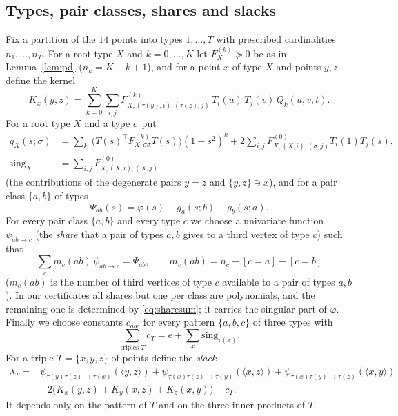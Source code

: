 \documentclass[11pt]{article}
\theoremstyle{definition}
\newcommand{\ip}[2]{\langle #1,#2\rangle}
\newcommand{\PSD}{\succeq 0}
\begin{document}
\subsection{Types, pair classes, shares and slacks}
Fix a partition of the $14$ points into types $1,\dots,T$ with prescribed cardinalities $n_1,\dots,n_T$. For a root type
$X$ and $k=0,\dots,K$ let $F_X^{(k)}\PSD$ be as in Lemma~\ref{lem:pd} ($n_k=K-k+1$), and for a point $x$ of type $X$ and
points $y,z$ define the kernel
\[
 K_x(y,z)=\sum_{k=0}^{K}\sum_{i,j}F^{(k)}_{X,(\tau(y),i),(\tau(z),j)}\,T_i(u)\,T_j(v)\,Q_k(u,v,t).
\]
For a root type $X$ and a type $\sigma$ put
\begin{align*}
 g_X(s;\sigma)&=\sum_{k}\ \big(T(s)^{\!\top}F^{(k)}_{X,\sigma\sigma}T(s)\big)(1-s^2)^k
 +2\sum_{i,j}F^{(0)}_{X,(X,i),(\sigma,j)}T_i(1)T_j(s),\\
 \mathrm{sing}_X&=\sum_{i,j}F^{(0)}_{X,(X,i),(X,j)}
\end{align*}
(the contributions of the degenerate pairs $y=z$ and $\{y,z\}\ni x$), and for a pair class $\{a,b\}$ of types
\[
 \Psi_{ab}(s)=\varphi(s)-g_a(s;b)-g_b(s;a).
\]
For every pair class $\{a,b\}$ and every type $c$ we choose a univariate function $\psi_{ab\to c}$ (the \emph{share} that a
pair of types $a,b$ gives to a third vertex of type $c$) such that
\begin{equation}\label{eq:sharesum}
 \sum_c m_c(ab)\,\psi_{ab\to c}=\Psi_{ab},\qquad m_c(ab)=n_c-[c=a]-[c=b]
\end{equation}
($m_c(ab)$ is the number of third vertices of type $c$ available to a pair of types $a,b$). In our certificates all shares but
one per class are polynomials, and the remaining one is determined by \eqref{eq:sharesum}; it carries the singular part of
$\varphi$. Finally we choose constants $c_{abc}$ for every pattern $\{a,b,c\}$ of three types with
\begin{equation}\label{eq:constsum}
 \sum_{\text{triples }T}c_{T}=e+\sum_{x}\mathrm{sing}_{\tau(x)} .
\end{equation}
For a triple $T=\{x,y,z\}$ of points define the \emph{slack}
\begin{equation}\label{eq:slack}
\begin{aligned}
 \lambda_T={}&\psi_{\tau(y)\tau(z)\to\tau(x)}(\ip{y}{z})+\psi_{\tau(x)\tau(z)\to\tau(y)}(\ip{x}{z})
 +\psi_{\tau(x)\tau(y)\to\tau(z)}(\ip{x}{y})\\
 &-2\big(K_x(y,z)+K_y(x,z)+K_z(x,y)\big)-c_T .
\end{aligned}
\end{equation}
It depends only on the pattern of $T$ and on the three inner products of $T$.
\end{document}
